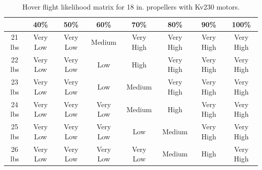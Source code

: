 \documentclass{article}
\begin{document}
\begin{table}[h]
    \centering
    \begin{tabular}{|c|c|c|c|c|c|c|c|}
        \hline
 & 40\% & 50\% & 60\% & 70\% & 80\% & 90\% & 100\%  \\
        \hline
        21 lbs & \cellcolor{red!80} Very Low & \cellcolor{red!80} Very Low & \cellcolor{yellow!60} Medium & \cellcolor{ForestGreen!80} Very High & \cellcolor{ForestGreen!80} Very High & \cellcolor{ForestGreen!80} Very High & \cellcolor{ForestGreen!80} Very High \\
        \hline
        22 lbs & \cellcolor{red!80} Very Low & \cellcolor{red!80} Very Low & \cellcolor{red!20} Low & \cellcolor{ForestGreen!40} High & \cellcolor{ForestGreen!80} Very High & \cellcolor{ForestGreen!80} Very High & \cellcolor{ForestGreen!80} Very High \\
        \hline
        23 lbs & \cellcolor{red!80} Very Low & \cellcolor{red!80} Very Low & \cellcolor{red!20} Low & \cellcolor{yellow!60} Medium & \cellcolor{ForestGreen!80} Very High & \cellcolor{ForestGreen!80} Very High & \cellcolor{ForestGreen!80} Very High \\
        \hline
        24 lbs & \cellcolor{red!80} Very Low & \cellcolor{red!80} Very Low & \cellcolor{red!80} Very Low & \cellcolor{yellow!60} Medium & \cellcolor{ForestGreen!40} High & \cellcolor{ForestGreen!80} Very High & \cellcolor{ForestGreen!80} Very High \\
        \hline
        25 lbs & \cellcolor{red!80} Very Low & \cellcolor{red!80} Very Low & \cellcolor{red!80} Very Low & \cellcolor{red!20} Low & \cellcolor{yellow!60} Medium & \cellcolor{ForestGreen!80} Very High & \cellcolor{ForestGreen!80} Very High \\
        \hline
        26 lbs & \cellcolor{red!80} Very Low & \cellcolor{red!80} Very Low & \cellcolor{red!80} Very Low & \cellcolor{red!80} Very Low & \cellcolor{yellow!60} Medium & \cellcolor{ForestGreen!40} High & \cellcolor{ForestGreen!80} Very High \\
        \hline
    \end{tabular}
    \caption{Hover flight likelihood matrix for 18 in. propellers with Kv230 motors.}
    \label{tab:hover_likelihood_matrix_18}
\end{table}
\end{document}
